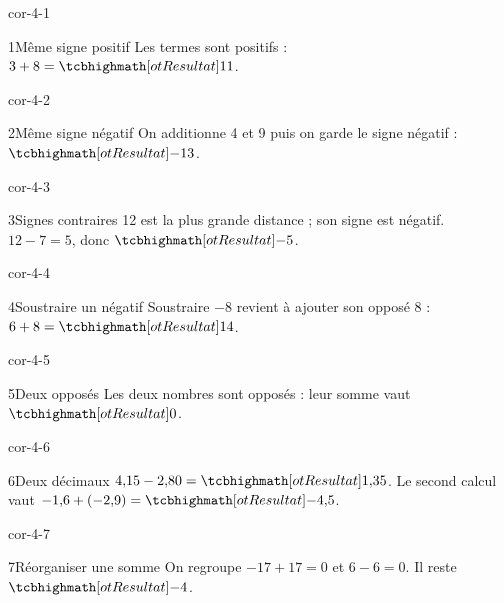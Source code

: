 \clearpage\pagestyle{otMain}\setlength{\otBlocEspacement}{2.5mm}\fontsize{11}{15}\selectfont{}
\begin{blocLivre}{cor-4-1}\begin{corrige}{1}{Même signe positif}
Les termes sont positifs : $3+8=\res{11}$.
\end{corrige}\end{blocLivre}
\begin{blocLivre}{cor-4-2}\begin{corrige}{2}{Même signe négatif}
On additionne 4 et 9 puis on garde le signe négatif : $\res{-13}$.
\end{corrige}\end{blocLivre}
\begin{blocLivre}{cor-4-3}\begin{corrige}{3}{Signes contraires}
12 est la plus grande distance ; son signe est négatif. $12-7=5$, donc $\res{-5}$.
\end{corrige}\end{blocLivre}
\begin{blocLivre}{cor-4-4}\begin{corrige}{4}{Soustraire un négatif}
Soustraire $-8$ revient à ajouter son opposé 8 : $6+8=\res{14}$.
\end{corrige}\end{blocLivre}
\begin{blocLivre}{cor-4-5}\begin{corrige}{5}{Deux opposés}
Les deux nombres sont opposés : leur somme vaut $\res0$.
\end{corrige}\end{blocLivre}
\begin{blocLivre}{cor-4-6}\begin{corrige}{6}{Deux décimaux}
$4{,}15-2{,}80=\res{1{,}35}$. Le second calcul vaut $-1{,}6+(-2{,}9)=\res{-4{,}5}$.
\end{corrige}\end{blocLivre}
\begin{blocLivre}{cor-4-7}\begin{corrige}{7}{Réorganiser une somme}
On regroupe $-17+17=0$ et $6-6=0$. Il reste $\res{-4}$.
\end{corrige}\end{blocLivre}

